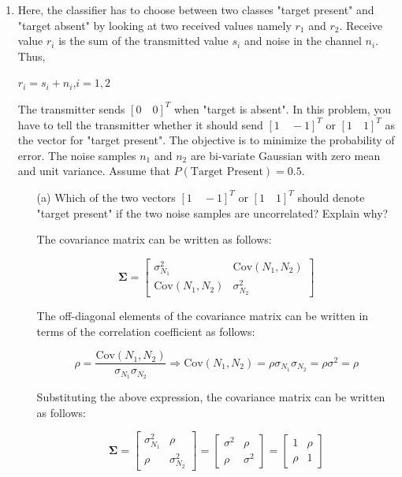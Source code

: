 \documentclass[fleqn]{article}
\begin{document}
\begin{enumerate}
		\item Here, the classifier has to choose between two classes "target present" and "target absent" by looking at two received values namely $r_1$ and $r_2$. Receive value $r_i$ is the sum of the transmitted value $s_i$ and noise in the channel $n_i$. Thus,
		
		$r_i = s_i + n_i$,\quad$i=1,2$
		
		The transmitter sends $[0 \quad 0]^T$ when "target is absent". In this problem, you have to tell the transmitter whether it should send $[1 \quad -1]^T$ or $ [1 \quad 1]^T$ as the vector for "target present". The objective is to minimize the probability of error. The noise samples $n_1$ and $n_2$ are bi-variate Gaussian with zero mean and unit variance. Assume that $P(\text{Target Present}) = 0.5$.
		
		\begin{enumerate}
			\item[(a)] Which of the two vectors $[1 \quad -1]^T$ or $[1 \quad 1]^T$ should denote "target present" if the two noise samples are uncorrelated? Explain why?
			
			The covariance matrix can be written as follows:
			
			\begin{equation*}
				\mathbf{\Sigma} = \begin{bmatrix}
					\sigma_{N_1}^2 & \text{Cov}(N_1,N_2) \\
					\text{Cov}(N_1,N_2) & \sigma_{N_2}^2
				\end{bmatrix}
			\end{equation*}
			
			The off-diagonal elements of the covariance matrix can be written in terms of the correlation coefficient as follows:
			 
			\begin{equation*}
				\rho = \frac{\text{Cov}(N_1,N_2)}{\sigma_{N_1}\sigma_{N_2}} \Rightarrow \text{Cov}(N_1,N_2) = \rho\sigma_{N_1}\sigma_{N_2} = \rho\sigma^2 = \rho
			\end{equation*}
			
			Substituting the above expression, the covariance matrix can be written as follows:
			
			\begin{equation*}
				\mathbf{\Sigma} = \begin{bmatrix}
					\sigma_{N_1}^2 & \rho \\
					\rho & \sigma_{N_2}^2
				\end{bmatrix} = \begin{bmatrix}
					\sigma^2 & \rho \\
					\rho & \sigma^2
				\end{bmatrix} = \begin{bmatrix}
					1 & \rho \\
					\rho & 1
				\end{bmatrix}
			\end{equation*}
			

\end{enumerate}
\end{enumerate}
\end{document}
